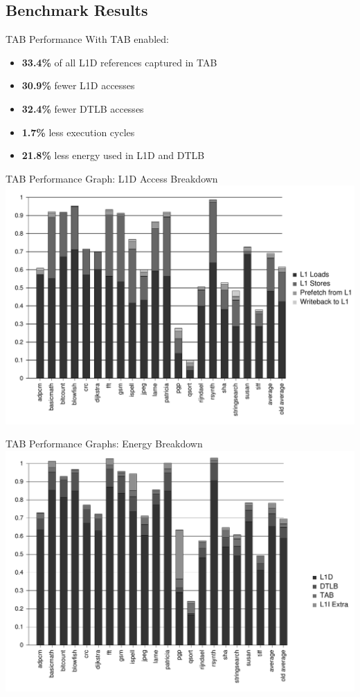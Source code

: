 \documentclass{beamer}
\begin{document}
\subsection{Benchmark Results}
\begin{frame}{TAB Performance}
   With TAB enabled:
   \begin{itemize}
      \item \textbf{33.4\%} of all L1D references captured in TAB
      \item \textbf{30.9\%} fewer L1D accesses
      \item \textbf{32.4\%} fewer DTLB accesses
      \item \textbf{1.7\%} less execution cycles
      \item \textbf{21.8\%} less energy used in L1D and DTLB
   \end{itemize}
\end{frame}
\begin{frame}{TAB Performance Graph: L1D Access Breakdown}
   \includegraphics[width=\textwidth]{figures/dl1_access.pdf}
\end{frame}
\begin{frame}{TAB Performance Graphs: Energy Breakdown}
   \includegraphics[width=\textwidth]{figures/energy_e_stage.pdf}
\end{frame}
\end{document}

